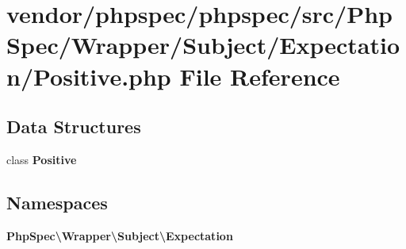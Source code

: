 \section{vendor/phpspec/phpspec/src/\+Php\+Spec/\+Wrapper/\+Subject/\+Expectation/\+Positive.php File Reference}
\label{_positive_8php}
\subsection*{Data Structures}
\begin{DoxyCompactItemize}
\item 
class {\bf Positive}
\end{DoxyCompactItemize}
\subsection*{Namespaces}
\begin{DoxyCompactItemize}
\item 
 {\bf Php\+Spec\textbackslash{}\+Wrapper\textbackslash{}\+Subject\textbackslash{}\+Expectation}
\end{DoxyCompactItemize}
